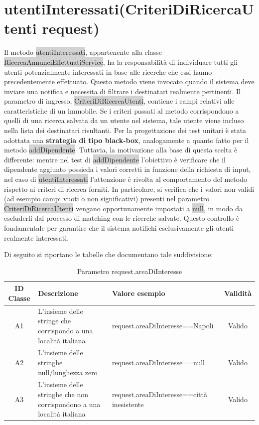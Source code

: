 \section{utentiInteressati(CriteriDiRicercaUtenti request)}

Il metodo \colorbox{lightgray}{utentiInteressati}, appartenente alla classe \colorbox{lightgray}{RicercaAnnunciEffettuatiService}, ha la responsabilità di individuare tutti gli utenti potenzialmente interessati in base alle ricerche che essi hanno precedentemente effettuato.
Questo metodo viene invocato quando il sistema deve inviare una notifica e necessita di filtrare i destinatari realmente pertinenti. Il parametro di ingresso, \colorbox{lightgray}{CriteriDiRicercaUtenti}, contiene i campi relativi alle caratteristiche di un immobile. Se i criteri passati al metodo corrispondono a quelli di una ricerca salvata da un utente nel sistema, tale utente viene incluso nella lista dei destinatari risultanti.
\newline
Per la progettazione dei test unitari è stata adottata una \textbf{strategia di tipo black-box}, analogamente a quanto fatto per il metodo \colorbox{lightgray} {addDipendente}. Tuttavia, la motivazione alla base di questa scelta è differente: mentre nel test di \colorbox{lightgray}{addDipendente} l’obiettivo è verificare che il dipendente aggiunto possieda i valori corretti in funzione della richiesta di input, nel caso di \colorbox{lightgray}{utentiInteressati} l’attenzione è rivolta al comportamento del metodo rispetto ai criteri di ricerca forniti.
In particolare, si verifica che i valori non validi (ad esempio campi vuoti o non significativi) presenti nel parametro \colorbox{lightgray}{CriteriDiRicercaUtenti} vengano opportunamente impostati a \colorbox{lightgray}{null}, in modo da escluderli dal processo di matching con le ricerche salvate. Questo controllo è fondamentale per garantire che il sistema notifichi esclusivamente gli utenti realmente interessati.

Di seguito si riportano le tabelle che documentano tale suddivisione:

\begin{table}[H]
	\centering
	\begin{tabular}{|c|p{4cm}|p{6cm}|c|} 
		\hline
		\textbf{ID Classe} & \textbf{Descrizione} & \textbf{Valore esempio} & \textbf{Validità} \\
		\hline
		A1 & L'insieme delle stringe che corrispondo a una località italiana
		& request.areaDiInteresse==Napoli & Valido \\
		\hline
		A2 & L'insieme delle stringhe null/lunghezza zero
		& request.areaDiInteresse==null & Valido \\
		\hline
		A3 & L'insieme delle stringhe che non corrispondono a una località italiana
		& request.areaDiInteresse==città inesistente & Valido \\
		\hline
	\end{tabular}
	\caption{Parametro request.areaDiInteresse}
	\label{tab:parametriRequestAreaDiInteresse}
\end{table}

